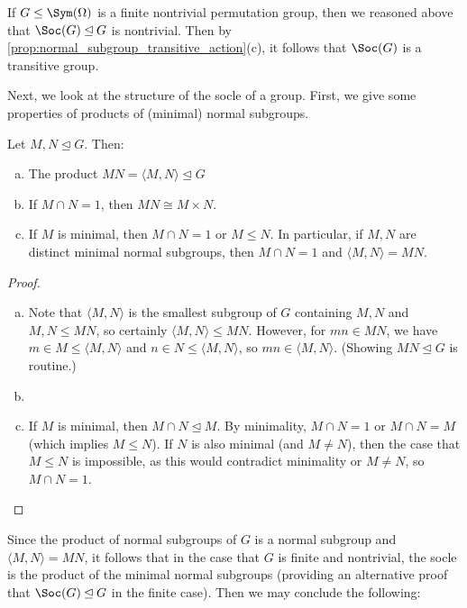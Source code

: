 If $G \leq \Sym(\Omega)$ is a finite nontrivial permutation group, then we reasoned above that $\Soc(G) \unlhd G$ is nontrivial. Then by \autoref{prop:normal_subgroup_transitive_action}(c),  it follows that $\Soc(G)$ is a transitive group.

Next, we look at the structure of the socle of a group. First, we give some properties of products of (minimal) normal subgroups.

\begin{lemma}\label{lem:minimal_normal_subgroups}
    Let $M,N \unlhd G$. Then:
    \begin{enumerate}[(a)]
        \item The product $MN = \langle M,N \rangle \unlhd G$
        \item If $M \cap N = 1$, then $MN \cong M \times N$.
        \item If $M$ is minimal, then $M \cap N = 1$ or $M \leq N$. In particular, if $M,N$ are distinct minimal normal subgroups, then $M \cap N = 1$ and $\langle M,N \rangle = MN$.
    \end{enumerate}
\end{lemma}

\begin{proof}
    \begin{enumerate}[(a)]
        \item Note that $\langle M,N \rangle$ is the smallest subgroup of $G$ containing $M,N$ and $M,N \leq MN$, so certainly $\langle M,N \rangle \leq MN$. However, for $mn \in MN$, we have $m \in M \leq \langle M,N \rangle$ and $n \in N \leq \langle M,N \rangle$, so $mn \in \langle M,N \rangle$. (Showing $MN \unlhd G$ is routine.)
        \item {}
        \item If $M$ is minimal, then $M \cap N \unlhd M$. By minimality, $M \cap N = 1$ or $M \cap N = M$ (which implies $M \leq N$). If $N$ is also minimal (and $M \neq N$), then the case that $M \leq N$ is impossible, as this would contradict minimality or $M \neq N$, so $M \cap N = 1$.
    \end{enumerate}
\end{proof}

Since the product of normal subgroups of $G$ is a normal subgroup and $\langle M,N \rangle = MN$, it follows that in the case that $G$ is finite and nontrivial, the socle is the product of the minimal normal subgroups (providing an alternative proof that $\Soc(G) \unlhd G$ in the finite case). Then we may conclude the following:


